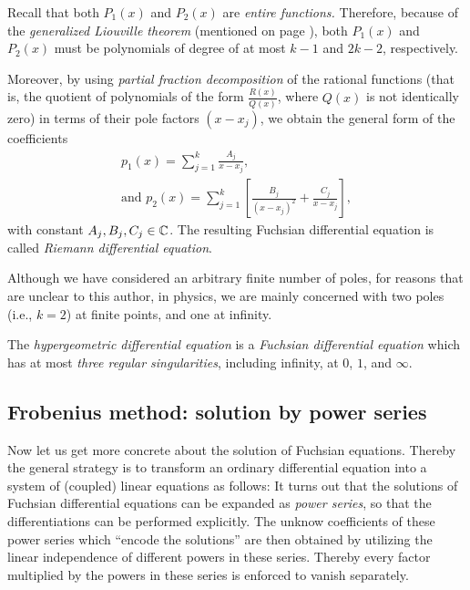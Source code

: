 Recall that both $P_1(x)$ and $P_2(x)$ are {\em entire functions.}
Therefore, because of the {\em generalized Liouville theorem} \cite{Greene}
(mentioned on page \pageref{2012-m-ch-ca-lt}),
\label{2014-m-ch-sf-glt}
both
$P_1(x)$ and $P_2(x)$ must be polynomials
of degree of at most $k-1$ and $2k-2$, respectively.

Moreover, by using
{\em partial fraction decomposition}
\cite{KristenssonC3}
of the rational functions
(that is, the quotient of polynomials of the form $\frac{R(x)}{Q(x)}$, where $Q(x)$ is not identically zero)
in terms of their pole factors $(x-x_j)$,
we obtain the general form of the coefficients
\begin{equation}
\begin{split}
p_1 (x)  = \sum_{j=1}^k \frac{A_j}{x-x_j},\\
\textrm{and }
p_2(x) = \sum_{j=1}^k \left[ \frac{B_j}{(x-x_j)^2}   +  \frac{C_j}{x-x_j} \right]
,
\end{split}
\label{2012-m-ch-sf-eforp12359}
\end{equation}
with constant $A_j, B_j, C_j \in {\Bbb C}$.
The resulting Fuchsian differential equation
is called
{\em Riemann differential equation}.



Although we have considered an arbitrary finite number of poles,
for reasons that are unclear to this author,
in physics, we are mainly concerned
with two poles (i.e., $k=2$)
at finite points, and one at infinity.

The {\em hypergeometric differential equation} is a {\em Fuchsian differential equation}
which has at most {\em three regular singularities}, including infinity,
at \cite{Kuznetsov}  $0$, $1$, and $\infty$.

\subsection{Frobenius method: solution by power series}

Now let us get more concrete about the solution of Fuchsian equations.
Thereby the general strategy is to transform an ordinary differential equation
into a system of (coupled) linear equations as follows:
It turns out that the solutions of Fuchsian differential equations can be
expanded as {\em power series}, so that the differentiations can be performed explicitly.
The unknow coefficients of these power series  which ``encode the solutions'' are then
obtained by utilizing the linear independence of different powers in these series.
Thereby every factor
multiplied by the powers in these series is enforced to vanish separately.

